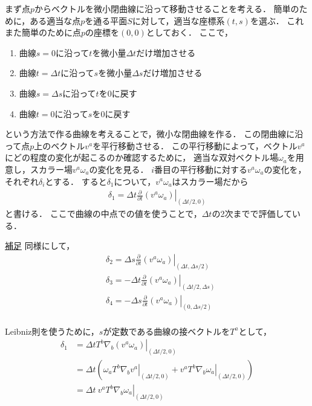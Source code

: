 \documentclass[a4paper]{jsarticle}
\newcommand{\pdif}[2]{\frac{\partial #1}{\partial #2}}
\begin{document}
まず点$p$からベクトルを微小閉曲線に沿って移動させることを考える．
簡単のために，ある適当な点$p$を通る平面$S$に対して，適当な座標系$(t, s)$を選ぶ．
これまた簡単のために点$p$の座標を$(0, 0)$としておく．
ここで，
\begin{enumerate}
	\item 曲線$s=0$に沿って$t$を微小量$\Delta t$だけ増加させる
	\item 曲線$t=\Delta t$に沿って$s$を微小量$\Delta s$だけ増加させる
	\item 曲線$s=\Delta s$に沿って$t$を0に戻す
	\item 曲線$t=0$に沿って$s$を0に戻す
\end{enumerate}
という方法で作る曲線を考えることで，微小な閉曲線を作る．
この閉曲線に沿って点$p$上のベクトル$v^a$を平行移動させる．
この平行移動によって，ベクトル$v^a$にどの程度の変化が起こるのか確認するために，
適当な双対ベクトル場$\omega_a$を用意し，スカラー場$v^a \omega_a$の変化を見る．
$i$番目の平行移動に対する$v^a \omega_a$の変化を，それぞれ$\delta_i$とする．
すると$\delta_1$について，$v^a \omega_a$はスカラー場だから
\begin{align}
	\delta_1 = \left. \Delta t \pdif{}{t} \left( v^a \omega_a \right)
	\right|_{(\Delta t/ 2, 0)}
\end{align}
と書ける．
ここで曲線の中点での値を使うことで，$\Delta t$の2次までで評価している．
\begin{itembox}[l]{\underline{補足}}
	同様にして，
	\begin{align}
		&\delta_2 = \left. \Delta s \pdif{}{t} \left( v^a \omega_a \right)
		\right|_{(\Delta t, \Delta s/2)} \\
		& \delta_3 = -\left. \Delta t \pdif{}{t} \left( v^a \omega_a \right)
		\right|_{(\Delta t/2, \Delta s)} \\
		&\delta_4 = -\left. \Delta s \pdif{}{t} \left( v^a \omega_a \right)
		\right|_{(0, \Delta s/2)} \\
	\end{align}
\end{itembox}
Leibniz則を使うために，$s$が定数である曲線の接ベクトルを$T^a$として，
\begin{align}
	\delta_1 &= \Delta t \left. T^b \nabla_b \left( v^a \omega_a \right)
	\right|_{(\Delta t/2, 0)} \\
	&= \Delta t \left(
		\omega_a \left. T^b \nabla_b v^a \right|_{(\Delta t/2, 0)}
		+ v^a \left. T^b \nabla_b \omega_a \right|_{(\Delta t/2, 0)} 
	\right) \\
	&= \Delta t \ v^a \left. T^b \nabla_b \omega_a \right|_{(\Delta t/2, 0)}
\end{align}
\end{document}
